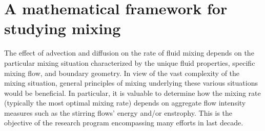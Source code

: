 	
\section{A mathematical framework for studying mixing}

The effect of advection and diffusion on the rate of fluid mixing depends on the particular mixing situation characterized by the unique fluid properties, specific mixing flow, and boundary geometry. In view of the vast complexity of the mixing situation, general principles of mixing underlying these various situations would be beneficial. In particular, it is valuable to determine how the mixing rate (typically the most optimal mixing rate) depends on aggregate flow intensity measures such as the stirring flows' energy and/or enstrophy. This is the objective of the research program encompassing many efforts \cite{CS2013,GI2014,JLT2012,JFM2011,  JLT2012, DF2014, GM2005,Yao2014a,JMP2012,Cortelezzi2008,Miles2018,Miles2017a} in last decade. 

